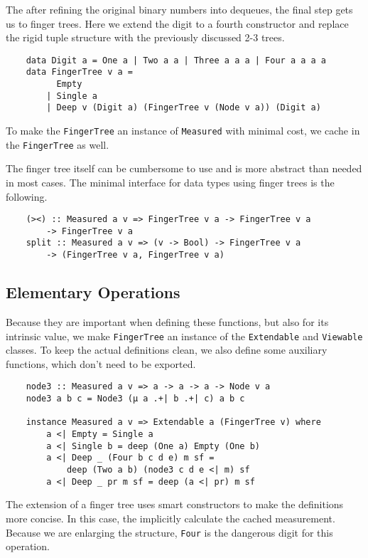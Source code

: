 The after refining the original binary numbers into dequeues, the final step gets us to finger trees. Here we extend the digit to a fourth constructor and replace the rigid tuple structure with the previously discussed 2-3 trees.

\begin{verbatim}
    data Digit a = One a | Two a a | Three a a a | Four a a a a
    data FingerTree v a =
          Empty
        | Single a
        | Deep v (Digit a) (FingerTree v (Node v a)) (Digit a)
\end{verbatim}

To make the \texttt{FingerTree} an instance of \texttt{Measured} with minimal cost, we cache in the \texttt{FingerTree} as well.\par
The finger tree itself can be cumbersome to use and is more abstract than needed in most cases. The minimal interface for data types using finger trees is the following.

\begin{verbatim}
    (><) :: Measured a v => FingerTree v a -> FingerTree v a
        -> FingerTree v a
    split :: Measured a v => (v -> Bool) -> FingerTree v a
        -> (FingerTree v a, FingerTree v a)
\end{verbatim}

\subsection{Elementary Operations}

Because they are important when defining these functions, but also for its intrinsic value, we make \texttt{FingerTree} an instance of the \texttt{Extendable} and \texttt{Viewable} classes. To keep the actual definitions clean, we also define some auxiliary functions, which don't need to be exported.

\begin{verbatim}
    node3 :: Measured a v => a -> a -> a -> Node v a
    node3 a b c = Node3 (μ a .+| b .+| c) a b c

    instance Measured a v => Extendable a (FingerTree v) where
        a <| Empty = Single a
        a <| Single b = deep (One a) Empty (One b)
        a <| Deep _ (Four b c d e) m sf =
            deep (Two a b) (node3 c d e <| m) sf
        a <| Deep _ pr m sf = deep (a <| pr) m sf
\end{verbatim}

The extension of a finger tree uses smart constructors to make the definitions more concise. In this case, the implicitly calculate the cached measurement. Because we are enlarging the structure, \texttt{Four} is the dangerous digit for this operation.

